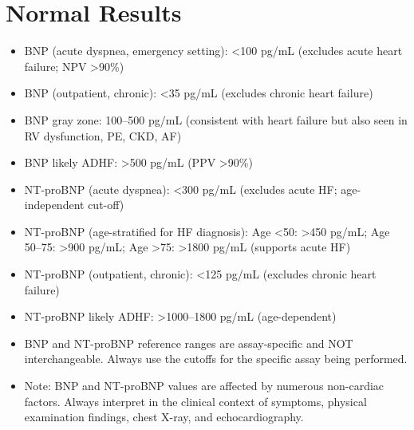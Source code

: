 \section*{Normal Results}
\begin{itemize}
  \item BNP (acute dyspnea, emergency setting): <100 pg/mL (excludes acute heart failure; NPV >90\%)
  \item BNP (outpatient, chronic): <35 pg/mL (excludes chronic heart failure)
  \item BNP gray zone: 100--500 pg/mL (consistent with heart failure but also seen in RV dysfunction, PE, CKD, AF)
  \item BNP likely ADHF: >500 pg/mL (PPV >90\%)
  \item NT-proBNP (acute dyspnea): <300 pg/mL (excludes acute HF; age-independent cut-off)
  \item NT-proBNP (age-stratified for HF diagnosis): Age <50: >450 pg/mL; Age 50--75: >900 pg/mL; Age >75: >1800 pg/mL (supports acute HF)
  \item NT-proBNP (outpatient, chronic): <125 pg/mL (excludes chronic heart failure)
  \item NT-proBNP likely ADHF: >1000--1800 pg/mL (age-dependent)
  \item BNP and NT-proBNP reference ranges are assay-specific and NOT interchangeable. Always use the cutoffs for the specific assay being performed.
  \item Note: BNP and NT-proBNP values are affected by numerous non-cardiac factors. Always interpret in the clinical context of symptoms, physical examination findings, chest X-ray, and echocardiography.
\end{itemize}

